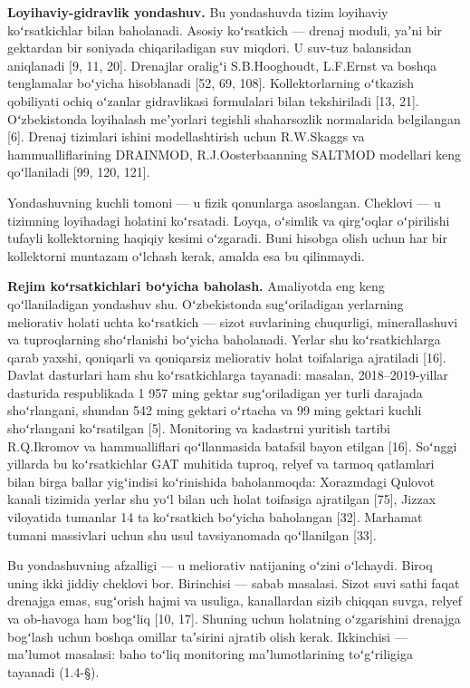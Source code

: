 \documentclass[14pt,a4paper,oneside]{extreport}
\begin{document}
\textbf{Loyihaviy-gidravlik yondashuv.} Bu yondashuvda tizim loyihaviy
koʻrsatkichlar bilan baholanadi. Asosiy koʻrsatkich --- drenaj moduli,
yaʼni bir gektardan bir soniyada chiqariladigan suv miqdori. U suv-tuz
balansidan aniqlanadi {[}9, 11, 20{]}. Drenajlar oraligʻi S.B.Hooghoudt,
L.F.Ernst va boshqa tenglamalar boʻyicha hisoblanadi {[}52, 69, 108{]}.
Kollektorlarning oʻtkazish qobiliyati ochiq oʻzanlar gidravlikasi
formulalari bilan tekshiriladi {[}13, 21{]}. Oʻzbekistonda loyihalash
meʼyorlari tegishli shaharsozlik normalarida belgilangan {[}6{]}. Drenaj
tizimlari ishini modellashtirish uchun R.W.Skaggs va hammualliflarining
DRAINMOD, R.J.Oosterbaanning SALTMOD modellari keng qoʻllaniladi {[}99,
120, 121{]}.

Yondashuvning kuchli tomoni --- u fizik qonunlarga asoslangan. Cheklovi
--- u tizimning loyihadagi holatini koʻrsatadi. Loyqa, oʻsimlik va
qirgʻoqlar oʻpirilishi tufayli kollektorning haqiqiy kesimi oʻzgaradi.
Buni hisobga olish uchun har bir kollektorni muntazam oʻlchash kerak,
amalda esa bu qilinmaydi.

\textbf{Rejim koʻrsatkichlari boʻyicha baholash.} Amaliyotda eng keng
qoʻllaniladigan yondashuv shu. Oʻzbekistonda sugʻoriladigan yerlarning
meliorativ holati uchta koʻrsatkich --- sizot suvlarining chuqurligi,
minerallashuvi va tuproqlarning shoʻrlanishi boʻyicha baholanadi. Yerlar
shu koʻrsatkichlarga qarab yaxshi, qoniqarli va qoniqarsiz meliorativ
holat toifalariga ajratiladi {[}16{]}. Davlat dasturlari ham shu
koʻrsatkichlarga tayanadi: masalan, 2018--2019-yillar dasturida
respublikada 1 957 ming gektar sugʻoriladigan yer turli darajada
shoʻrlangani, shundan 542 ming gektari oʻrtacha va 99 ming gektari
kuchli shoʻrlangani koʻrsatilgan {[}5{]}. Monitoring va kadastrni
yuritish tartibi R.Q.Ikromov va hammualliflari qoʻllanmasida batafsil
bayon etilgan {[}16{]}. Soʻnggi yillarda bu koʻrsatkichlar GAT muhitida
tuproq, relyef va tarmoq qatlamlari bilan birga ballar yigʻindisi
koʻrinishida baholanmoqda: Xorazmdagi Qulovot kanali tizimida yerlar shu
yoʻl bilan uch holat toifasiga ajratilgan {[}75{]}, Jizzax viloyatida
tumanlar 14 ta koʻrsatkich boʻyicha baholangan {[}32{]}. Marhamat tumani
massivlari uchun shu usul tavsiyanomada qoʻllanilgan {[}33{]}.

Bu yondashuvning afzalligi --- u meliorativ natijaning oʻzini oʻlchaydi.
Biroq uning ikki jiddiy cheklovi bor. Birinchisi --- sabab masalasi.
Sizot suvi sathi faqat drenajga emas, sugʻorish hajmi va usuliga,
kanallardan sizib chiqqan suvga, relyef va ob-havoga ham bogʻliq {[}10,
17{]}. Shuning uchun holatning oʻzgarishini drenajga bogʻlash uchun
boshqa omillar taʼsirini ajratib olish kerak. Ikkinchisi --- maʼlumot
masalasi: baho toʻliq monitoring maʼlumotlarining toʻgʻriligiga tayanadi
(1.4-§).
\end{document}
